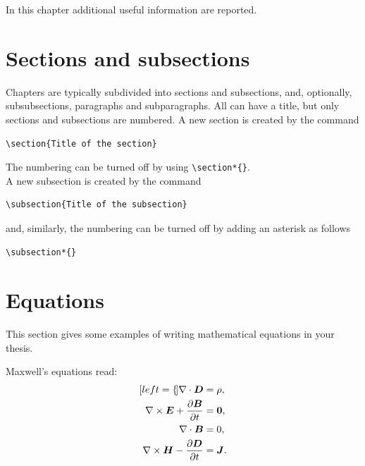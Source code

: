 \documentclass{Configuration_Files/PoliMi3i_thesis}
\begin{document}
In this chapter additional useful information are reported.

\section{Sections and subsections}
\label{sec:section_name}
Chapters are typically subdivided into sections and subsections, and, optionally,
subsubsections, paragraphs and subparagraphs.
All can have a title, but only sections and subsections are numbered.
A new section is created by the command
\begin{verbatim}
\section{Title of the section}
\end{verbatim}
The numbering can be turned off by using \verb|\section*{}|.
\\
A new subsection is created by the command
\begin{verbatim}
\subsection{Title of the subsection}
\end{verbatim}
and, similarly, the numbering can be turned off by adding an asterisk as follows 
\begin{verbatim}
\subsection*{}
\end{verbatim}

\section{Equations}
\label{sec:eqs}
This section gives some examples of writing mathematical equations in your thesis.

Maxwell's equations read:
\begin{subequations}
    \label{eq:maxwell}
    \begin{align}[left=\empheqlbrace]
    \nabla\cdot \bm{D} & = \rho, \label{eq:maxwell1} \\
    \nabla \times \bm{E} +  \frac{\partial \bm{B}}{\partial t} & = \bm{0}, \label{eq:maxwell2} \\
    \nabla\cdot \bm{B} & = 0, \label{eq:maxwell3} \\
    \nabla \times \bm{H} - \frac{\partial \bm{D}}{\partial t} &= \bm{J}. \label{eq:maxwell4}
    \end{align}
\end{subequations}
\end{document}
